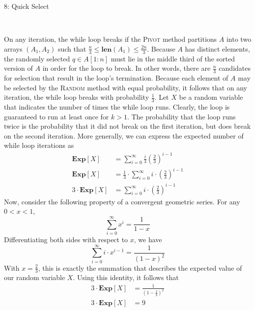 \documentclass[12pt]{article}
\begin{document}
\begin{solution}
\begin{problem}{8: Quick Select}
\end{problem}
\begin{solution} \ \\
    \begin{subprob}
        \item On any iteration, the while loop breaks if the \textsc{Pivot} method partitions $A$ into two arrays $(A_1, A_2)$ such that $\frac{n}{3} \leq \textbf{len}(A_1) \leq \frac{2n}{3}$. Because $A$ has distinct elements, the randomly selected $q \in A[1 : n]$ must lie in the middle third of the sorted version of $A$ in order for the loop to break. In other words, there are $\frac{n}{3}$ candidates for selection that result in the loop's termination. Because each element of $A$ may be selected by the \textsc{Random} method with equal probability, it follows that on any iteration, the while loop breaks with probability $\frac{1}{3}$.  Let $X$ be a random variable that indicates the number of times the while loop runs. Clearly, the loop is guaranteed to run at least once for $k > 1$. The probability that the loop runs twice is the probability that it did not break on the first iteration, but does break on the second iteration. More generally, we can express the expected number of while loop iterations as 
        \begin{align*}
            \textbf{Exp}[X] &= \sum\limits_{i=0}^{\infty} \frac{i}{3} \left(\frac{2}{3}\right)^{i-1} \\
                     \textbf{Exp}[X] &= \frac{1}{3} \cdot \sum\limits_{i=0}^{\infty} i \cdot \left(\frac{2}{3}\right)^{i-1} \\
                     3 \cdot \textbf{Exp}[X] &= \sum\limits_{i=0}^{\infty} i \cdot \left(\frac{2}{3}\right)^{i-1}
        \end{align*}
        Now, consider the following property of a convergent geometric series. For any $0 < x < 1$, 
        \[
        \sum\limits_{i=0}^{\infty}x^i = \frac{1}{1-x}
        \]
        Differentiating both sides with respect to $x$, we have
        \[
        \sum\limits_{i=0}^{\infty}i \cdot x^{i-1} = \frac{1}{(1-x)^2}
        \]
        With $x=\frac{2}{3}$, this is exactly the summation that describes the expected value of our random variable $X$. Using this identity, it follows that
        \begin{align*}
            3 \cdot \textbf{Exp}[X] &= \frac{1}{(1 - \frac{2}{3})^2} \\
            3 \cdot \textbf{Exp}[X] &= 9 \\

\end{align*}
\end{subprob}
\end{solution}
\end{solution}
\end{document}
